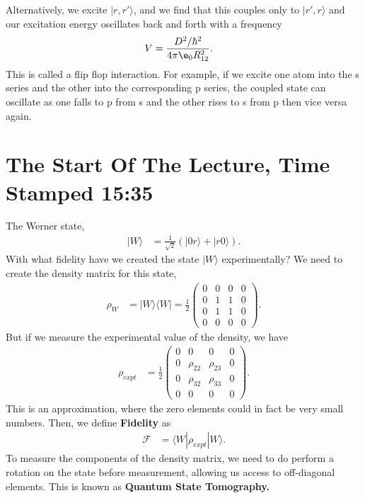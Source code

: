 \documentclass[a4paper, 11pt, normalem]{report}
\begin{document}
Alternatively, we excite $|r,r'\rangle$, and we find that this couples only to $|r',r\rangle$ and our excitation energy oscillates back and forth with a frequency
\begin{align}
    V &= \frac{D^2/\hbar^2}{4\pi\e_0 R_{12}^2}.
\end{align}
This is called a flip flop interaction. 
For example, if we excite one atom into the s series and the other into the corresponding p series, the coupled state can oscillate as one falls to p from s and the other rises to s from p then vice versa again.

\section{The Start Of The Lecture, Time Stamped 15:35}
The Werner state,
\begin{align}
    |W\rangle &= \frac{1}{\sqrt{2}}\left(|0r\rangle + |r0\rangle\right).
\end{align}
With what fidelity have we created the state $|W\rangle$ experimentally?
We need to create the density matrix for this state,
\begin{align}
    \rho_W &= |W\rangle\langle W| = \frac12 \begin{pmatrix} 0 & 0 & 0 & 0 \\ 0 & 1 & 1 & 0 \\ 0 & 1 & 1 & 0 \\ 0 & 0 & 0 & 0 \end{pmatrix}.
\end{align}
But if we measure the experimental value of the density, we have
\begin{align}
    \rho_{expt} &= \frac12 \begin{pmatrix} 0 & 0 & 0 & 0 \\ 0 & \rho_{22} & \rho_{23} & 0 \\ 0 & \rho_{32} & \rho_{33} & 0 \\ 0 & 0 & 0 & 0 \end{pmatrix}.
\end{align}
This is an approximation, where the zero elements could in fact be very small numbers.
Then, we define \textbf{Fidelity} as
\begin{align}
    \mathcal{F} &= \langle W|\rho_{expt}|W\rangle.
\end{align}
To measure the components of the density matrix, we need to do perform a rotation on the state before measurement, allowing us access to off-diagonal elements.
This is known as \textbf{Quantum State Tomography.}
\end{document}
